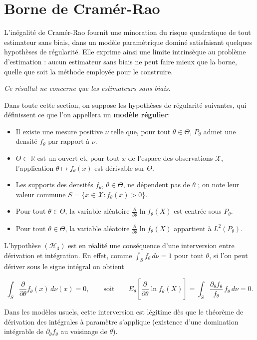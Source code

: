 \chapter{Borne de Cramér-Rao}

L'inégalité de Cramér-Rao fournit une minoration du risque quadratique de tout estimateur sans biais, dans un modèle paramétrique dominé satisfaisant quelques hypothèses de régularité. Elle exprime ainsi une limite intrinsèque au problème d'estimation : aucun estimateur sans biais ne peut faire mieux que la borne, quelle que soit la méthode employée pour le construire.

\textit{Ce résultat ne concerne que les estimateurs sans biais.}

\medskip
Dans toute cette section, on suppose les hypothèses de régularité suivantes, qui définissent ce que l'on appellera un \textbf{modèle régulier}:

\begin{itemize}
  \item[$(\mathcal{H}_0)$] Il existe une mesure positive $\nu$ telle que, pour tout $\theta \in \Theta$, $P_\theta$ admet une densité $f_\theta$ par rapport à $\nu$.
  \item[$(\mathcal{H}_1)$] $\Theta \subset \mathbb{R}$ est un ouvert et, pour tout $x$ de l'espace des observations $\mathcal{X}$, l'application $\theta \longmapsto f_\theta(x)$ est dérivable sur $\Theta$.
  \item[$(\mathcal{H}_2)$] Les supports des densités $f_\theta$, $\theta \in \Theta$, ne dépendent pas de $\theta$ ; on note leur valeur commune $S = \{x \in \mathcal{X} : f_\theta(x) > 0\}$.
  \item[$(\mathcal{H}_3)$] Pour tout $\theta \in \Theta$, la variable aléatoire $\frac{\partial}{\partial\theta} \ln f_\theta(X)$ est centrée sous $P_\theta$.
  \item[$(\mathcal{H}_4)$] Pour tout $\theta \in \Theta$, la variable aléatoire $\frac{\partial}{\partial\theta} \ln f_\theta(X)$ appartient à $L^2(P_\theta)$.
\end{itemize}

\begin{remarque}
L'hypothèse $(\mathcal{H}_3)$ est en réalité une conséquence d'une interversion entre
dérivation et intégration. En effet, comme $\int_S f_\theta \, d\nu = 1$ pour tout
$\theta$, si l'on peut dériver sous le signe intégral on obtient

$$
  \int_S \frac{\partial}{\partial\theta} f_\theta(x)\, d\nu(x) = 0,
  \qquad\text{soit}\qquad
  E_\theta\!\left[ \frac{\partial}{\partial\theta} \ln f_\theta(X) \right]
  = \int_S \frac{\partial_\theta f_\theta}{f_\theta}\, f_\theta \, d\nu = 0.
$$

Dans les modèles usuels, cette interversion est légitime dès que le théorème de dérivation des intégrales à paramètre s'applique (existence d'une domination intégrable de $\partial_\theta f_\theta$ au voisinage de $\theta$).
\end{remarque}


